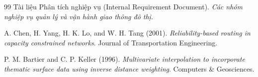\begin{thebibliography}{99}
Tài liệu Phân tích nghiệp vụ (Internal Requirement Document). \textit{Các nhóm nghiệp vụ quản lý và vận hành giao thông đô thị}.

A. Chen, H. Yang, H. K. Lo, and W. H. Tang (2001). \textit{Reliability-based routing in capacity constrained networks}. Journal of Transportation Engineering.

P. M. Bartier and C. P. Keller (1996). \textit{Multivariate interpolation to incorporate thematic surface data using inverse distance weighting}. Computers \& Geosciences.

\end{thebibliography}